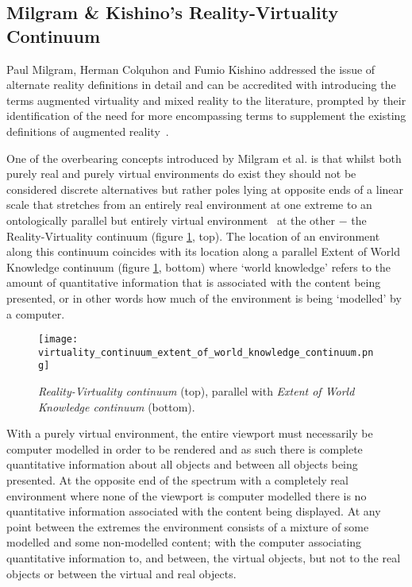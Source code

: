 \subsection{Milgram \& Kishino's Reality-Virtuality Continuum}
\label{milgram&kishino}
Paul Milgram, Herman Colquhon and Fumio Kishino addressed the issue of alternate reality definitions in detail and can be accredited with introducing the terms augmented virtuality and mixed reality to the literature, prompted by their identification of the need for more encompassing terms to supplement the existing definitions of augmented reality~\cite{Milgram1994, Milgram1999}.


One of the overbearing concepts introduced by Milgram et al. is that whilst both purely real and purely virtual environments do exist they should not be considered discrete alternatives but rather poles lying at opposite ends of a linear scale that stretches from an entirely real environment at one extreme to an ontologically parallel but entirely virtual environment~\cite{Qvortrup2002} at the other $-$ the Reality-Virtuality continuum (figure \ref{reality_virtuality_extent_of_world_knowledge_continuum}, top). The location of an environment along this continuum coincides with its location along a parallel Extent of World Knowledge continuum (figure \ref{reality_virtuality_extent_of_world_knowledge_continuum}, bottom) where `world knowledge' refers to the amount of quantitative information that is associated with the content being presented, or in other words how much of the environment is being `modelled' by a computer.

\begin{figure}[h]
\centering
\texttt{[image: virtuality\_continuum\_extent\_of\_world\_knowledge\_continuum.png]}
\caption{\textit{Reality-Virtuality continuum} (top), parallel with \textit{Extent of World Knowledge continuum} (bottom).}
\label{reality_virtuality_extent_of_world_knowledge_continuum}
\end{figure}

With a purely virtual environment, the entire viewport must necessarily be computer modelled in order to be rendered and as such there is complete quantitative information about all objects and between all objects being presented. At the opposite end of the spectrum with a completely real environment where none of the viewport is computer modelled there is no quantitative information associated with the content being displayed. At any point between the extremes the environment consists of a mixture of some modelled and some non-modelled content; with the computer associating quantitative information to, and between, the virtual objects, but not to the real objects or between the virtual and real objects.

